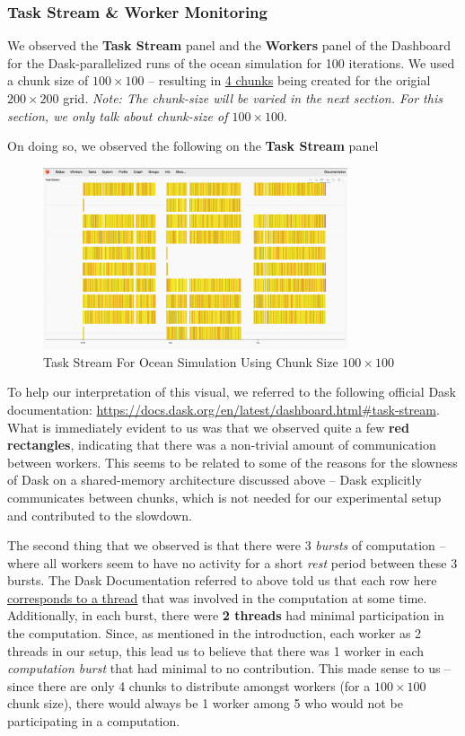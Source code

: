 \documentclass[a4paper,12pt]{article}
\begin{document}
\subsubsection{Task Stream \& Worker Monitoring}
We observed the \textbf{Task Stream} panel and the \textbf{Workers} panel of the Dashboard for the Dask-parallelized runs of the ocean simulation for 100 iterations. We used a chunk size of $100 \times 100$ -- resulting in \underline{4 chunks} being created for the origial $200 \times 200$ grid. \textit{Note: The chunk-size will be varied in the next section. For this section, we only talk about chunk-size of $100 \times 100$}. 

On doing so, we observed the following on the \textbf{Task Stream} panel


\begin{figure}[H]
  \centering
  \includegraphics[width=0.8\textwidth]{../images/task_stream_100chunk.png}
  \caption{Task Stream For Ocean Simulation Using Chunk Size $100 \times 100$}
\end{figure}

To help our interpretation of this visual, we referred to the following official Dask documentation: \url{https://docs.dask.org/en/latest/dashboard.html#task-stream}. What is immediately evident to us was that we observed quite a few \textbf{red rectangles}, indicating that there was a non-trivial amount of communication between workers. This seems to be related to some of the reasons for the slowness of Dask on a shared-memory architecture discussed above -- Dask explicitly communicates between chunks, which is not needed for our experimental setup and contributed to the slowdown.  

The second thing that we observed is that there were 3 \textit{bursts} of computation -- where all workers seem to have no activity for a short \textit{rest} period between these 3 bursts. The Dask Documentation referred to above told us that each row here \underline{corresponds to a thread} that was involved in the computation at some time. Additionally, in each burst, there were \textbf{2 threads} had minimal participation in the computation. Since, as mentioned in the introduction, each worker as 2 threads in our setup, this lead us to believe that there was 1 worker in each \textit{computation burst} that had minimal to no contribution. This made sense to us -- since there are only 4 chunks to distribute amongst workers (for a $100 \times 100$ chunk size), there would always be 1 worker among 5 who would not be participating in a computation. 
\end{document}
